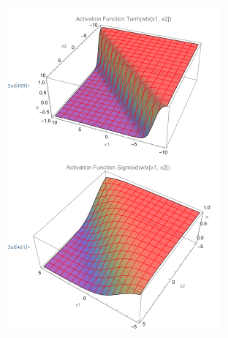 \documentclass{article}
\begin{document}
\begin{flushleft}
\begin{enumerate}
\begin{figure}[H]
      \includegraphics[width=0.5\textwidth]{3_d.PNG}  %
    \end{figure}
    \end{enumerate}


\end{flushleft}
\end{document}
